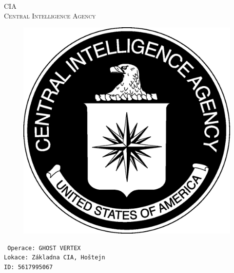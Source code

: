 \documentclass[a4paper, \fontheight]{article}
\begin{document}
	\begin{titlepage}
		\begin{center}		
			\textsc{{\fontsize{80}{0}\selectfont CIA}\\[2em]
				\Huge Central Intelligence Agency\\[2.5em]}
				
			\begin{figure}[H]
				\centering
				\includegraphics[scale=0.6]{sources/CIA_logo.eps}
			\end{figure}
		\end{center}	
		\vfill
		\noindent
		\texttt{\LARGE
				Operace: GHOST VERTEX\\[0.4em]
				Lokace: Základna CIA, Hoštejn\\[0.4em]
				ID: 5617995067}	
\end{titlepage} 
\end{document}
